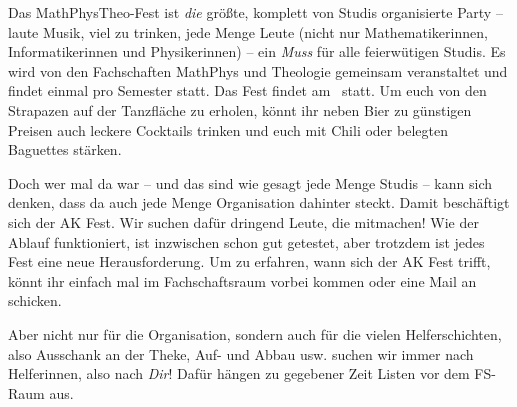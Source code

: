 
Das MathPhysTheo-Fest ist \emph{die} größte, komplett von Studis organisierte Party -- laute Musik, viel zu trinken, jede Menge Leute (nicht nur Mathematikerinnen, Informatikerinnen und Physikerinnen) -- ein \emph{Muss} für alle feierwütigen Studis. Es wird von den Fachschaften MathPhys und Theologie gemeinsam veranstaltet und findet einmal pro Semester statt. Das Fest findet am \mathphystheotermin\ statt. Um euch von den Strapazen auf der Tanzfläche zu erholen, könnt ihr neben Bier zu günstigen Preisen auch leckere Cocktails trinken und euch mit Chili oder belegten Baguettes stärken.

Doch wer mal da war -- und das sind wie gesagt jede Menge Studis -- kann sich denken, dass da auch jede Menge Organisation dahinter steckt. Damit beschäftigt sich der AK Fest. Wir suchen dafür dringend Leute, die mitmachen! Wie der Ablauf funktioniert, ist inzwischen schon gut getestet, aber trotzdem ist jedes Fest eine neue Herausforderung. Um zu erfahren, wann sich der AK Fest trifft, könnt ihr einfach mal im Fachschaftsraum vorbei kommen oder eine Mail an  schicken.

Aber nicht nur für die Organisation, sondern auch für die vielen Helferschichten, also Ausschank an der Theke, Auf- und Abbau usw. suchen wir immer nach Helferinnen, also nach \emph{Dir}! Dafür hängen zu gegebener Zeit Listen vor dem FS-Raum aus.

